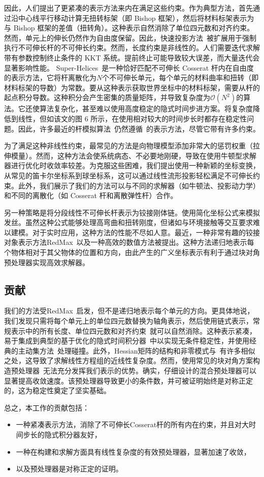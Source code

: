 因此，人们提出了更紧凑的表示方法来内在满足这些约束。作为典型方法，\cite{bergou_discrete_2008,bergou_discrete_2010}首先通过沿中心线平行移动计算无扭转标架（即 Bishop 框架），然后将材料标架表示为与 Bishop 框架的差值（扭转角）。这种表示自然消除了单位四元数和对齐约束。然而，单元上的伸长仍然作为自由度保留。因此，快速投影方法~\cite{goldenthal_efficient_2007}被扩展用于强制执行不可伸长杆的不可伸长约束。{\color{black}然而，长度约束是非线性的。人们需要迭代求解带有参数控制终止条件的 KKT 系统。提前终止可能导致较大误差，而大量迭代会显著影响性能。} Super-Helices~\cite{bertails_super-helices_2006}是一种恰好匹配不可伸长 Cosserat 杆内在自由度的表示方法，它将杆离散化为$N$个不可伸长单元，每个单元的材料曲率和扭转（即材料标架的导数）为常数。要从这种表示获取世界坐标中的材料标架，需要从杆的起点积分导数。这种积分会产生密集的质量矩阵，并导致复杂度为$\mathcal{O}(N^2)$的算法。它还使算法复杂化，甚至难以使用高度稳定的隐式时间步进方案。\cite{bertails_linear_2009}将复杂度降低到线性，但如该文的图 6 所示，\cite{bertails_super-helices_2006,bertails_linear_2009}在使用相对较大的时间步长时都存在稳定性问题。因此，许多最近的杆模拟算法~\cite{soler_cosserat_2018,wen_cosserat_2020}仍然遵循~\cite{spillmann_corde_2007}的表示方法，尽管它带有许多约束。

为了满足这种非线性约束，最常见的方法是向物理模型添加非常大的惩罚权重（拉伸模量）。然而，这种方法会使系统病态、不必要地刚硬，导致在使用牛顿型求解器进行优化时收敛率较差。为克服这些困难，我们提出使用一种新颖的坐标变换，从常见的笛卡尔坐标系到球坐标系，这可以通过线性流形投影轻松满足不可伸长约束。此外，我们展示了我们的方法可以与不同的求解器（如牛顿法、投影动力学）和不同的离散化（如 Cosserat 杆和离散弹性杆）合作。

另一种策略是将分段线性不可伸长杆表示为铰接刚体链。\cite{hadap_oriented_2006}使用简化坐标公式来模拟发丝。虽然这种公式能够处理高弯曲和扭转刚度，但诸如与环境接触等交互要求难以建模。对于实时应用，这种方法的性能不尽如人意。最近，一种非常有趣的铰接对象表示方法RedMax~\cite{wang_redmax_2019}以及一种高效的数值方法被提出。这种方法递归地表示每个物体相对于其父物体的位置和方向，由此产生的广义坐标表示有利于通过块对角预处理器实现高效求解器。

\subsection{贡献}

我们的方法受RedMax~\cite{wang_redmax_2019}启发，但不是递归地表示每个单元的方向。更具体地说，我们发现只需将每个单元上的单位四元数替换为轴角表示，然后使用链式表示，常规表示中的所有长度、单位四元数和对齐约束~\cite{spillmann_corde_2007}就可以自然消除。这种表示紧凑，易于集成到典型的基于优化的隐式时间积分器~\cite{martin2011example}中以实现无条件稳定性，并使用经典的主动集方法~\cite{nocedal1999numerical}处理碰撞。此外，Hessian矩阵的结构和非零模式与~\cite{wang_redmax_2019}有许多相似之处，这导致了求解线性方程组的近线性复杂度。然而，使用常见的块对角方案构造预处理器~\cite{tang2018clotha,wang_redmax_2019}无法充分发挥我们表示的优势。确实，仔细设计的混合预处理器可以显著提高收敛速度。该预处理器导致更小的条件数，并可被证明始终是对称正定的，这为稳定性奠定了坚实基础。

总之，本工作的贡献包括：
\begin{itemize}
\item 一种紧凑表示方法，消除了不可伸长Cosserat杆的所有内在约束，并且对大时间步长的隐式积分器友好，
\item 一种在构建和求解方面具有线性复杂度的有效预处理器，显著加速了收敛，
\item 以及预处理器是对称正定的证明。
\end{itemize}